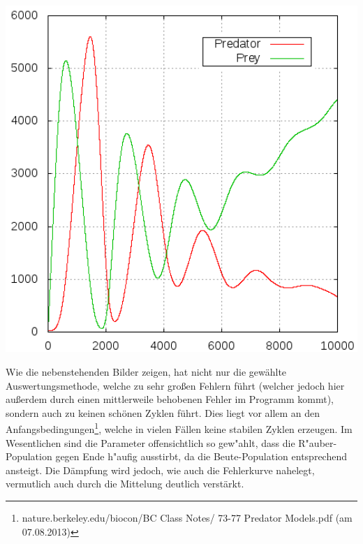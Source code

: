\documentclass[11pt]{article}
\begin{document}
\begin{minipage}[b]{0.58\textwidth}
\includegraphics[width=1.0\textwidth]{Graphiken/ppm45pop.png}
\end{minipage}
\begin{minipage}[b]{0.39\textwidth}
Wie die nebenstehenden Bilder zeigen, hat nicht nur die gewählte Auswertungsmethode, welche zu sehr großen Fehlern führt (welcher jedoch hier außerdem durch einen mittlerweile behobenen Fehler im Programm kommt), sondern auch zu keinen schönen Zyklen führt. Dies liegt vor allem an den Anfangsbedingungen\footnote{nature.berkeley.edu/biocon/BC Class Notes/ 73-77 Predator Models.pdf (am 07.08.2013)}, welche in vielen Fällen keine stabilen Zyklen erzeugen. Im Wesentlichen sind die Parameter offensichtlich so gew"ahlt, dass die R"auber-Population gegen Ende h"aufig ausstirbt, da die Beute-Population entsprechend ansteigt. Die Dämpfung wird jedoch, wie auch die Fehlerkurve nahelegt, vermutlich auch durch die Mittelung deutlich verstärkt.

\end{minipage}
\end{document}
